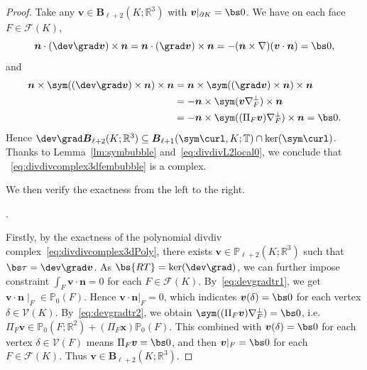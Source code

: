 \begin{proof}
Take any $\boldsymbol v\in \boldsymbol B_{\ell+2}(K;\mathbb R^3)$ with $\boldsymbol v|_{\partial K}=\bs0$.
We have on each face $F\in\mathcal F(K)$,
\begin{equation}\label{eq:devgradtr1}
\boldsymbol n\cdot(\dev\grad\boldsymbol v)\times\boldsymbol n=\boldsymbol n\cdot(\grad\boldsymbol v)\times\boldsymbol n=-(\boldsymbol n\times\nabla)(\boldsymbol v\cdot\boldsymbol n)=\bs0,
\end{equation}
and
\begin{align}
\boldsymbol n\times \sym((\dev\grad\boldsymbol v)\times\boldsymbol n)\times\boldsymbol n&=\boldsymbol n\times \sym((\grad\boldsymbol v)\times\boldsymbol n)\times\boldsymbol n \notag\\
&=-\boldsymbol n\times \sym(\boldsymbol v\nabla_F^{\bot})\times\boldsymbol n \notag\\
&=-\boldsymbol n\times \sym((\Pi_F\boldsymbol v)\nabla_F^{\bot})\times\boldsymbol n=\bs0. \label{eq:devgradtr2}
\end{align}
Hence $\dev\grad\boldsymbol B_{\ell+2}(K;\mathbb R^3)\subseteq\boldsymbol B_{\ell+1}(\sym\curl, K;\mathbb T)\cap\ker(\sym\curl)$.
Thanks to Lemma~\ref{lm:symbubble} and~\eqref{eq:divdivL2local0}, we conclude that ~\eqref{eq:divdivcomplex3dfembubble} is a complex.

We then verify the exactness from the left to the right.

\medskip
{}. 

Firstly, by the exactness of the polynomial divdiv complex~\eqref{eq:divdivcomplex3dPoly}, there exists $\boldsymbol v\in\mathbb P_{\ell+2}(K;\mathbb R^3)$ such that $\bs\tau=\dev\grad\boldsymbol v$. As $\bs{RT}=\ker(\dev\grad)$, we  can further impose constraint $\int_F \boldsymbol v\cdot\boldsymbol n=0$ for each $F\in\mathcal F(K)$.
By~\eqref{eq:devgradtr1}, we get $ \boldsymbol v\cdot\boldsymbol n \mid _F\in\mathbb P_0(F)$. Hence $\boldsymbol v\cdot\boldsymbol n|_F=0$, which indicates $\boldsymbol v(\delta)=\bs0$ for each vertex $\delta\in\mathcal V(K)$.
By~\eqref{eq:devgradtr2}, we obtain $\sym((\Pi_F\boldsymbol v)\nabla_F^{\bot})=\bs0$, i.e. $\Pi_F\boldsymbol v\in\mathbb P_0(F;\mathbb R^2)+(\Pi_F\boldsymbol x)\mathbb P_0(F)$. This combined with $\boldsymbol v(\delta)=\bs0$ for each vertex $\delta\in\mathcal V(F)$ means $\Pi_F\boldsymbol v=\bs0$, and then $\boldsymbol v|_F=\bs0$ for each $F\in \mathcal F(K)$. Thus $\boldsymbol v\in \boldsymbol B_{\ell+2}(K;\mathbb R^3)$.


\end{proof}
